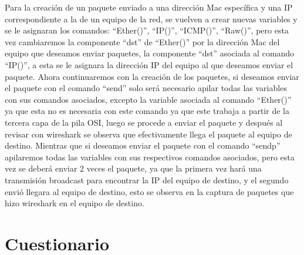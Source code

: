 \documentclass{udpreport}
\begin{document}
		Para la creación de un paquete enviado a una dirección Mac específica y una IP correspondiente a la de un equipo de la red, se vuelven a crear nuevas variables y se le asignaran los comandos: “Ether()”, “IP()”, “ICMP()”, “Raw()”, pero esta vez cambiaremos la componente “dst” de “Ether()” por la dirección Mac del equipo que deseamos enviar paquetes, la componente “dst” asociada al comando “IP()”, a esta se le asignara la dirección IP del equipo al que  deseamos enviar el paquete. Ahora continuaremos con la creación de los paquetes, si deseamos enviar el paquete con el comando “send” solo será necesario apilar todas las variables con sus comandos asociados, excepto la variable asociada al comando “Ether()” ya que esta no es necesaria con este comando ya que este trabaja a partir de la tercera capa de la pila OSI, luego se procede a enviar el paquete y  después al revisar con wireshark se observa que efectivamente llega el paquete al equipo de destino. Mientras que si deseamos enviar el paquete con el comando “sendp” apilaremos todas las variables con sus respectivos comandos asociados,  pero esta vez se deberá enviar 2 veces el paquete, ya que la primera vez hará una transmisión broadcast para encontrar la IP del equipo de destino, y el segundo envió llegara al equipo de destino, esto se observa en la captura de paquetes que hizo wireshark en el equipo de destino.\\
	\section{Cuestionario}
	
\end{document}
